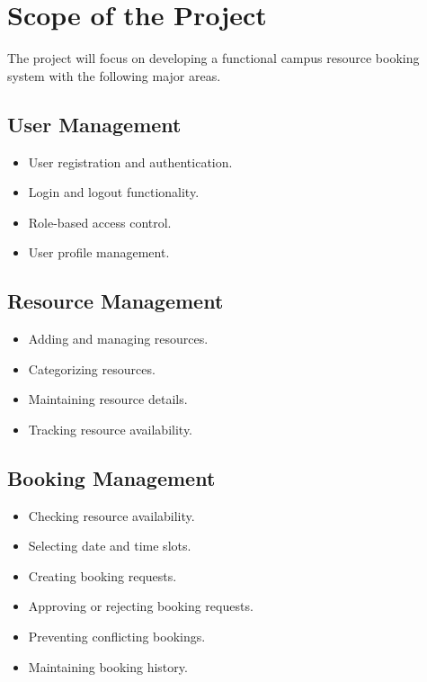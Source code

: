 \documentclass[12pt,a4paper]{article}
\begin{document}

\section{Scope of the Project}

The project will focus on developing a functional campus resource booking system with the following major areas.


\subsection{User Management}

\begin{itemize}
    \item User registration and authentication.
    \item Login and logout functionality.
    \item Role-based access control.
    \item User profile management.
\end{itemize}


\subsection{Resource Management}

\begin{itemize}
    \item Adding and managing resources.
    \item Categorizing resources.
    \item Maintaining resource details.
    \item Tracking resource availability.
\end{itemize}


\subsection{Booking Management}

\begin{itemize}
    \item Checking resource availability.
    \item Selecting date and time slots.
    \item Creating booking requests.
    \item Approving or rejecting booking requests.
    \item Preventing conflicting bookings.
    \item Maintaining booking history.
\end{itemize}
\end{document}
